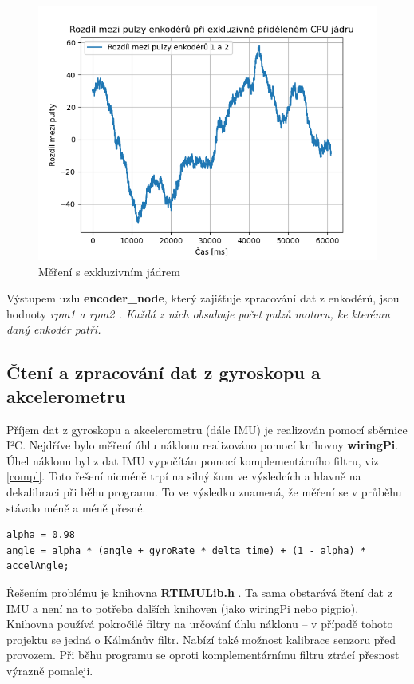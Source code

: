 \begin{figure}[H]
    \centering
    \includegraphics[width=0.8\linewidth]{obrazky-figures/good.png}
    \caption {Měření s exkluzivním jádrem}
    \label{enc_good}
\end{figure}

Výstupem uzlu \textbf{encoder\_node}, který zajišťuje zpracování dat z enkodérů, jsou hodnoty \it rpm1 \rm a \it rpm2 \rm. Každá z nich obsahuje počet pulzů motoru, ke kterému daný enkodér patří.

\subsection*{Čtení a zpracování dat z gyroskopu a akcelerometru}
Příjem dat z gyroskopu a akcelerometru (dále IMU) je realizován pomocí sběrnice I²C. Nejdříve bylo měření úhlu náklonu realizováno pomocí knihovny \textbf{wiringPi}. Úhel náklonu byl z dat IMU vypočítán pomocí komplementárního filtru, viz \ref{compl}. Toto řešení nicméně trpí na silný šum ve výsledcích a hlavně na dekalibraci při běhu programu. To ve výsledku znamená, že měření se v průběhu stávalo méně a méně přesné.

\begin{verbatim}
alpha = 0.98
angle = alpha * (angle + gyroRate * delta_time) + (1 - alpha) * accelAngle;
\end{verbatim}
\label{compl}

Řešením problému je knihovna \textbf{RTIMULib.h} \cite{RTIMULib}. Ta sama obstarává čtení dat z IMU a není na to potřeba dalších knihoven (jako wiringPi nebo pigpio). Knihovna používá pokročilé filtry na určování úhlu náklonu -- v případě tohoto projektu se jedná o Kálmánův filtr. Nabízí také možnost kalibrace senzoru před provozem. Při běhu programu se oproti komplementárnímu filtru ztrácí přesnost výrazně pomaleji.

